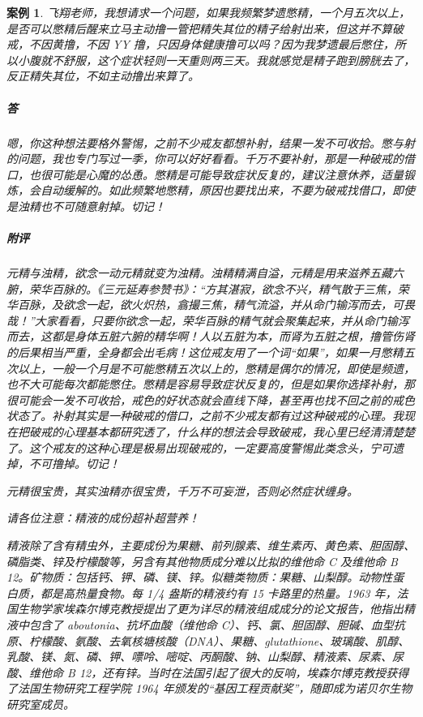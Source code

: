 \documentclass{ctexart}
\newtheorem{case}{案例}
\begin{document}
\begin{case}
    飞翔老师，我想请求一个问题，如果我频繁梦遗憋精，一个月五次以上，是否可以憋精后醒来立马主动撸一管把精失其位的精子给射出来，但这并不算破戒，不因黄撸，不因 YY 撸，只因身体健康撸可以吗？因为我梦遗最后憋住，所以小腹就不舒服，这个症状轻则一天重则两三天。我就感觉是精子跑到膀胱去了，反正精失其位，不如主动撸出来算了。
    \subparagraph{答} 嗯，你这种想法要格外警惕，之前不少戒友都想补射，结果一发不可收拾。憋与射的问题，我也专门写过一季，你可以好好看看。千万不要补射，那是一种破戒的借口，也很可能是心魔的怂恿。憋精是可能导致症状反复的，建议注意休养，适量锻炼，会自动缓解的。如此频繁地憋精，原因也要找出来，不要为破戒找借口，即使是浊精也不可随意射掉。切记！
    \subparagraph{附评} 元精与浊精，欲念一动元精就变为浊精。浊精精满自溢，元精是用来滋养五藏六腑，荣华百脉的。《三元延寿参赞书》：“方其湛寂，欲念不兴，精气散于三焦，荣华百脉，及欲念一起，欲火炽热，翕撮三焦，精气流溢，并从命门输泻而去，可畏哉！”大家看看，只要你欲念一起，荣华百脉的精气就会聚集起来，并从命门输泻而去，这都是身体五脏六腑的精华啊！人以五脏为本，而肾为五脏之根，撸管伤肾的后果相当严重，全身都会出毛病！这位戒友用了一个词“如果”，如果一月憋精五次以上，一般一个月是不可能憋精五次以上的，憋精是偶尔的情况，即使是频遗，也不大可能每次都能憋住。憋精是容易导致症状反复的，但是如果你选择补射，那很可能会一发不可收拾，戒色的好状态就会直线下降，甚至再也找不回之前的戒色状态了。补射其实是一种破戒的借口，之前不少戒友都有过这种破戒的心理。我现在把破戒的心理基本都研究透了，什么样的想法会导致破戒，我心里已经清清楚楚了。这个戒友的这种心理是极易出现破戒的，一定要高度警惕此类念头，宁可遗掉，不可撸掉。切记！

    元精很宝贵，其实浊精亦很宝贵，千万不可妄泄，否则必然症状缠身。

    请各位注意：精液的成份超补超营养！

    精液除了含有精虫外，主要成份为果糖、前列腺素、维生素丙、黄色素、胆固醇、磷脂类、锌及柠檬酸等，另含有其他物质成分难以比拟的维他命 C 及维他命 B 12。矿物质：包括钙、钾、磷、镁、锌。似糖类物质：果糖、山梨醇。动物性蛋白质，都是高热量食物。每 1/4 盎斯的精液约有 15 卡路里的热量。1963 年，法国生物学家埃森尔博克教授提出了更为详尽的精液组成成分的论文报告，他指出精液中包含了 aboutonia、抗坏血酸（维他命 C）、钙、氯、胆固醇、胆碱、血型抗原、柠檬酸、氨酸、去氧核塘核酸（DNA）、果糖、glutathione、玻璃酸、肌醇、乳酸、镁、氮、磷、钾、嘌呤、嘧啶、丙酮酸、钠、山梨醇、精液素、尿素、尿酸、维他命 B 12，还有锌。当时在法国引起了很大的反响，埃森尔博克教授获得了法国生物研究工程学院 1964 年颁发的“基因工程贡献奖”，随即成为诺贝尔生物研究室成员。
\end{case}
\end{document}
